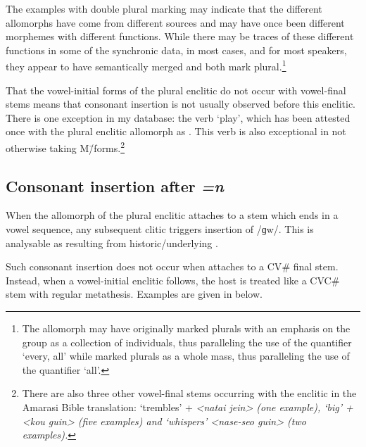 The examples with double plural marking may
indicate that the different allomorphs have come from different sources
and may have once been different morphemes with different functions.
While there may be traces of these different functions
in some of the synchronic data, in most cases, and for most speakers,
they appear to have semantically merged and both mark plural.\footnote{
		The allomorph  may have originally marked plurals with
		an emphasis on the group as a collection of individuals,
		thus paralleling the use of the quantifier  `every, all'
		while  marked plurals as a whole mass,
		thus paralleling the use of the quantifier  `all'.}

That the vowel-initial forms of the plural enclitic 
do not occur with vowel-final stems means that consonant
insertion is not usually observed before this enclitic.
There is one exception in my database:
the verb  `play', which has been attested once
with the plural enclitic allomorph  as .
This verb is also exceptional in not otherwise taking M\=/forms.\footnote{
		There are also three other vowel-final stems occurring with
		the enclitic  in the Amarasi Bible translation:
		 `trembles' +  {\ra} \it{<na{\Q}tai{\Q} jein>} (one example),
		 `big' +  {\ra} \it{<kou{\Q} guin>} (five examples)
		and  `whispers' {\ra} \it{<na{\Q}se{\Q}-seo{\Q} guin>} (two examples).}

\subsection{Consonant insertion after \it{=n}}\label{sec:ConInsPluEnc}
When the  allomorph of the plural enclitic
attaches to a stem which ends in a vowel sequence,
any subsequent clitic triggers insertion of /ɡw/.
This is analysable as resulting from historic/underlying .

Such consonant insertion does not occur 
when  attaches to a CV{\#} final stem.
Instead, when a vowel-initial enclitic follows,
the host is treated like a CVC{\#} stem with regular metathesis.
Examples are given in  below.

